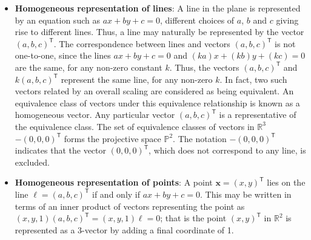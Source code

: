 \documentclass{report}
\begin{document}
\begin{itemize}
\begin{itemize}
                \item \textbf{Scalar / Standard Form:} \(ax + by + cz = d\), where \(d = ax_0 + by_0 + cz_0\).
                \item \textbf{General Form:} \(ax + by + cz + d = 0\).
                \item \textbf{Parametric Form:} \(\vec{r}(s, t) = \vec{r}_0 + s\vec{u} + t\vec{v}\), where \(\vec{u}\) and \(\vec{v}\) are two non-parallel vectors lying in the plane and \(s, t\) are real parameters
            \end{itemize}
            Given three non-collinear points $P,Q,R$
            \begin{itemize}
                \item Form two vectors in the plane, such as \(\vec{u} = \vec{PQ}\) and \(\vec{v} = \vec{PR}\).
                \item Compute their cross product \(\vec{n} = \vec{u} \times \vec{v}\) to get a normal vector.
                \item Use \(\vec{n}\) and any one of the three points in the point-normal formula
            \end{itemize}
        \item \textbf{Homogeneous representation of lines}: A line in the plane is represented by an equation such as $ax+by+c=0$, different choices of $a$, $b$ and $c$ giving rise to different lines. Thus, a line may naturally be represented by the vector $(a, b, c)^{\mathsf{T}}$. The correspondence between lines and vectors $(a, b, c)^{\mathsf{T}}$ is not one-to-one, since the lines $ax+by+c=0$ and $(ka)x+(kb)y+(kc)=0$ are the same, for any non-zero constant $k$. Thus, the vectors $(a, b, c)^{\mathsf{T}}$ and $k(a, b, c)^{\mathsf{T}}$ represent the same line, for any non-zero $k$.
            \bigbreak \noindent 
            In fact, two such vectors related by an overall scaling are considered as being equivalent. An equivalence class of vectors under this equivalence relationship is known as a homogeneous vector. Any particular vector $(a, b, c)^{\mathsf{T}}$ is a representative of the equivalence class. The set of equivalence classes of vectors in $\mathbb{R}^{3}$ $-(0, 0, 0)^{\mathsf{T}}$ forms the projective space $\mathbb{P}^{2}$. The notation $-(0, 0, 0)^{\mathsf{T}}$ indicates that the vector $(0, 0, 0)^{\mathsf{T}}$, which does not correspond to any line, is excluded.
        \item \textbf{Homogeneous representation of points}: A point $\mathbf{x}=(x, y)^{\mathsf{T}}$ lies on the line $ \mathbf{\ell} = (a, b, c)^{\mathsf{T}}$ if and only if $ax+by+c=0$. This may be written in terms of an inner product of vectors representing the point as $(x, y, 1)(a, b, c)^{\mathsf{T}}=(x, y, 1)\ell=0$; that is the point $(x, y)^{\mathsf{T}}$ in $\mathbb{R}^{2}$ is represented as a 3-vector by adding a final coordinate of 1.

\end{itemize}
\end{document}

